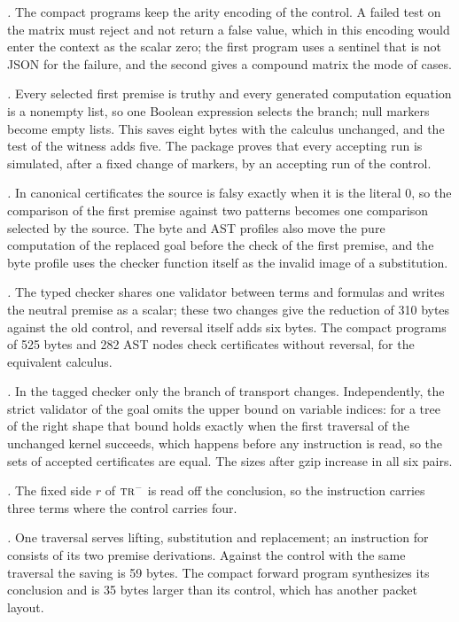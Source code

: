\emph{.}  The compact programs keep the
arity encoding of the control.  A failed test on the matrix must reject and
not return a false value, which in this encoding would enter the context as
the scalar zero; the first program uses a sentinel that is not JSON for the
failure, and the second gives a compound matrix the mode of cases.

\emph{.}  Every selected first premise is truthy and
every generated computation equation is a nonempty list, so one Boolean
expression selects the branch; null markers become empty lists.  This saves
eight bytes with the calculus unchanged, and the test of the witness adds
five.  The package proves that every accepting run is simulated, after a
fixed change of markers, by an accepting run of the control.

\emph{.}  In canonical certificates the source is
falsy exactly when it is the literal $0$, so the comparison of the first
premise against two patterns becomes one comparison selected by the source.
The byte and AST profiles also move the pure computation of the replaced
goal before the check of the first premise, and the byte profile uses the
checker function itself as the invalid image of a substitution.

\emph{.}  The typed checker shares one validator between
terms and formulas and writes the neutral premise as a scalar; these two
changes give the reduction of 310 bytes against the old control, and
reversal itself adds six bytes.  The compact programs of 525 bytes and 282
AST nodes check certificates without reversal, for the equivalent calculus.

\emph{.}  In the tagged checker only the branch of
transport changes.  Independently, the strict validator of the goal omits
the upper bound on variable indices: for a tree of the right shape that
bound holds exactly when the first traversal of the unchanged kernel
succeeds, which happens before any instruction is read, so the sets of
accepted certificates are equal.  The sizes after gzip increase in all six
pairs.

\emph{.}  The fixed side $r$ of
$\rulename{Tr}^{-}$ is read off the conclusion, so the instruction carries
three terms where the control carries four.

\emph{.}  One traversal serves lifting, substitution and
replacement; an instruction for  consists of its two premise
derivations.  Against the control with the same traversal the saving is 59
bytes.  The compact forward program synthesizes its conclusion and is 35
bytes larger than its control, which has another packet layout.

